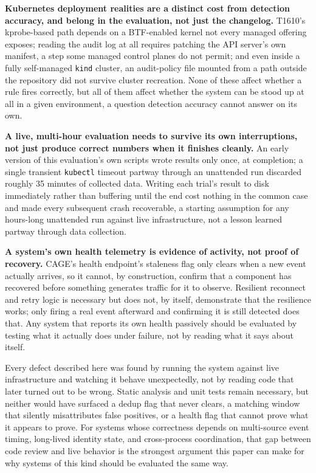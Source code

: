 \documentclass{ieeeaccess}
\begin{document}
\textbf{Kubernetes deployment realities are a distinct cost from
detection accuracy, and belong in the evaluation, not just the
changelog.} T1610's kprobe-based path depends on a BTF-enabled kernel
not every managed offering exposes; reading the audit log at all
requires patching the API server's own manifest, a step some managed
control planes do not permit; and even inside a fully self-managed
\texttt{kind} cluster, an audit-policy file mounted from a path outside
the repository did not survive cluster recreation. None of these
affect whether a rule fires correctly, but all of them affect whether
the system can be stood up at all in a given environment, a question
detection accuracy cannot answer on its own.

\textbf{A live, multi-hour evaluation needs to survive its own
interruptions, not just produce correct numbers when it finishes
cleanly.} An early version of this evaluation's own scripts wrote
results only once, at completion; a single transient \texttt{kubectl}
timeout partway through an unattended run discarded roughly 35 minutes
of collected data. Writing each trial's result to disk immediately
rather than buffering until the end cost nothing in the common case
and made every subsequent crash recoverable, a starting assumption for
any hours-long unattended run against live infrastructure, not a
lesson learned partway through data collection.

\textbf{A system's own health telemetry is evidence of activity, not
proof of recovery.} CAGE's health endpoint's staleness flag only
clears when a new event actually arrives, so it cannot, by
construction, confirm that a component has recovered before something
generates traffic for it to observe. Resilient reconnect and retry
logic is necessary but does not, by itself, demonstrate that the
resilience works; only firing a real event afterward and confirming it
is still detected does that. Any system that reports its own health
passively should be evaluated by testing what it actually does under
failure, not by reading what it says about itself.

Every defect described here was found by running the system against
live infrastructure and watching it behave unexpectedly, not by
reading code that later turned out to be wrong. Static analysis and
unit tests remain necessary, but neither would have surfaced a dedup
flag that never clears, a matching window that silently misattributes
false positives, or a health flag that cannot prove what it appears to
prove. For systems whose correctness depends on multi-source event
timing, long-lived identity state, and cross-process coordination,
that gap between code review and live behavior is the strongest
argument this paper can make for why systems of this kind should be
evaluated the same way.
\end{document}

